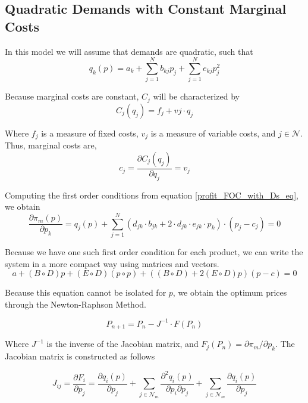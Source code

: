 \documentclass[12pt]{article}
\begin{document}
\subsection{Quadratic Demands with Constant Marginal Costs}

In this model we will assume that demands are quadratic, such that
\begin{equation*}
q_k(p) = a_k + \sum_{j=1}^N b_{kj}p_j + \sum_{j=1}^N e_{kj} p_j^2
\end{equation*}


Because marginal costs are constant, $C_j$ will be characterized by 
\begin{equation*}
C_j(q_j) = f_j + vj \cdot q_j
\end{equation*}

Where $f_j$ is a measure of fixed costs, $v_j$ is a measure of variable costs, and $j \in \mathcal{N}$. Thus, marginal costs are,
\begin{equation*}
c_j = \frac{\partial C_j(q_j)}{\partial q_j} = v_j
\end{equation*}

Computing the first order conditions from equation \ref{profit_FOC_with_Ds_eq}, we obtain
\begin{equation*}
\frac{\partial \pi_m(p)}{\partial p_k} = q_j(p) + \sum_{j=1}^N (d_{jk} \cdot b_{jk} + 2 \cdot d_{jk} \cdot e_{jk} \cdot p_k) \cdot (p_j - c_j) = 0
\end{equation*}

Because we have one such first order condition for each product, we can write the system in a more compact way using matrices and vectors.
\begin{equation*}
a +(B \circ D) p + (E \circ D) (p \circ p) + ((B \circ D) + 2 (E \circ D) p) (p - c) = 0 
\end{equation*}

Because this equation cannot be isolated for $p$, we obtain the optimum prices through the Newton-Raphson Method.

\begin{equation*}
P_{n+1} = P_n - J^{-1} \cdot F(P_n)
\end{equation*}

Where $J^{-1}$ is the inverse of the Jacobian matrix, and $F_j(P_n) = \partial \pi_m / \partial p_k$. The Jacobian matrix is constructed as follows

\begin{equation}
J_{ij} = \frac{\partial F_i}{\partial p_j} = \frac{\partial q_i(p)}{\partial p_j} + \sum_{j \in \mathcal{N}_m} \frac{\partial^2 q_i(p)}{\partial p_i \partial p_j} + \sum_{j \in \mathcal{N}_m} \frac{\partial q_i(p)}{\partial p_j}
\end{equation}
\end{document}
